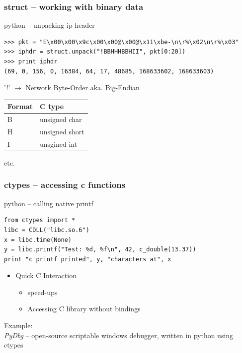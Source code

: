 \documentclass{beamer}
\begin{document}
\begin{frame}[fragile]
	\frametitle{struct -- working with binary data}
	\begin{exampleblock}{python -- unpacking ip header}
	\begin{lstlisting}
>>> pkt = "E\x00\x00\x9c\x00\x00@\x00@\x11\xbe-\n\r%\x02\n\r%\x03"
>>> iphdr = struct.unpack("!BBHHHBBHII", pkt[0:20])
>>> print iphdr
(69, 0, 156, 0, 16384, 64, 17, 48685, 168633602, 168633603)
	\end{lstlisting}
	\end{exampleblock}
	'!' $\rightarrow$ Network Byte-Order aka. Big-Endian\\[0.4cm]
	\begin{tabular}{|l|l|}	
	Format & C type\\
	\hline
	B & unsigned char\\
	H & unsigned short\\
	I & unsgined int\\	
	\end{tabular}
	
	
	etc.
\end{frame}

\begin{frame}[fragile]
	\frametitle{ctypes -- accessing c functions}
	\begin{exampleblock}{python -- calling native printf}
	\begin{lstlisting}
from ctypes import *
libc = CDLL("libc.so.6")
x = libc.time(None)
y = libc.printf("Test: %d, %f\n", 42, c_double(13.37))
print "c printf printed", y, "characters at", x
	\end{lstlisting}
	\end{exampleblock}
\pause
	\begin{itemize}
		\item Quick C Interaction
		\begin{itemize}
			\item speed-ups
			\item Accessing C library without bindings
		\end{itemize}
	\end{itemize}
	Example:\\
	\emph{PyDbg} -- open-source scriptable windows debugger, written in python using ctypes
\end{frame}
\end{document}
